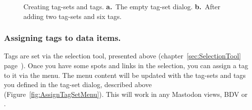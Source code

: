 \begin{figure}
    \centering
    \null\hfill
    \hfill
    \hfill\null
    
    \caption{Creating tag-sets and tags. \textbf{a.}~The empty tag-set dialog. \textbf{b.}~After adding two tag-sets and six tags.  }
    \label{fig:CreateTagSet}
\end{figure}


\subsubsection{Assigning tags to data items.}
\label{sec:AssigningTags}

Tags are set via the selection tool, presented above (chapter~\ref{sec:SelectionTool} page~\pageref{sec:SelectionTool}).
Once you have some spots and links in the selection, you can assign a tag to it via the  menu.
The menu content will be updated with the tag-sets and tags you defined in the tag-set dialog, described above (Figure~\ref{fig:AssignTagSetMenu}).
This will work in any Mastodon views, BDV or \TrackScheme.

